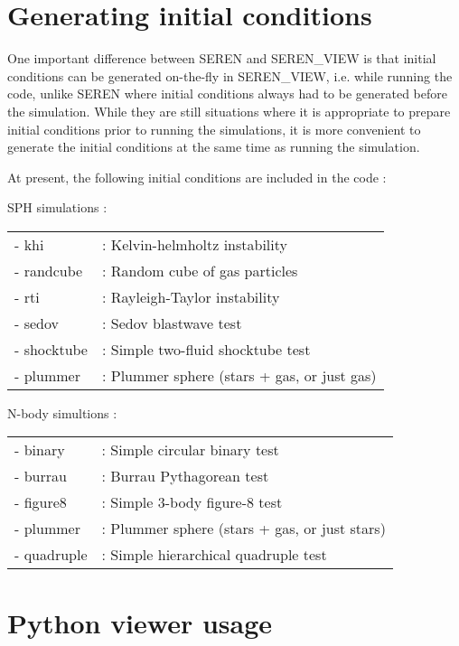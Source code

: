 \documentclass[a4paper]{article}
\begin{document}
\section{Generating initial conditions}

One important difference between SEREN and SEREN\_VIEW is that initial conditions can be generated on-the-fly in SEREN\_VIEW, i.e. while running the code, unlike SEREN where initial conditions always had to be generated before the simulation.  While they are still situations where it is appropriate to prepare initial conditions prior to running the simulations, it is more convenient to generate the initial conditions at the same time as running the simulation.

At present, the following initial conditions are included in the code : 

\noindent SPH simulations : \\
\begin{tabular}{ll}
- khi       &: Kelvin-helmholtz instability \\
- randcube  &: Random cube of gas particles \\
- rti       &: Rayleigh-Taylor instability \\
- sedov     &: Sedov blastwave test \\
- shocktube &: Simple two-fluid shocktube test \\
- plummer   &: Plummer sphere (stars + gas, or just gas)
\end{tabular}
\newline

\noindent N-body simultions : \\
\begin{tabular}{ll}
- binary    &: Simple circular binary test \\
- burrau    &: Burrau Pythagorean test \\
- figure8   &: Simple 3-body figure-8 test \\
- plummer   &: Plummer sphere (stars + gas, or just stars) \\
- quadruple &: Simple hierarchical quadruple test
\end{tabular}


\section{Python viewer usage}
\end{document}
